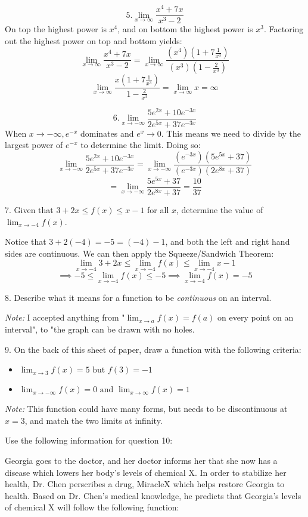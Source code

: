 \documentclass[fleqn]{article}
\begin{document}
\[5.\lim_{x\to\infty}\frac{x^4+7x}{x^3-2}\]
On top the highest power is $x^4$, and on bottom the highest power is $x^3$. Factoring out the highest power on top and bottom yields:
\[\lim_{x\to\infty}\frac{x^4+7x}{x^3-2}=\lim_{x\to\infty}\frac{(x^4)(1+7\frac{1}{x^3})}{(x^3)(1-\frac{2}{x^3})}\]
\[\lim_{x\to\infty}\frac{x(1+7\frac{1}{x^3})}{1-\frac{2}{x^3}}=\lim_{x\to\infty}x=\infty\]


\[6.\lim_{x\to -\infty}\frac{5e^{2x}+10e^{-3x}}{2e^{5x}+37e^{-3x}}\]
When $x\to-\infty, e^{-x}$ dominates and $e^{x}\to0$. This means we need to divide by the largest power of $e^{-x}$ to determine the limit.\linebreak
Doing so:
\[\lim_{x\to -\infty}\frac{5e^{2x}+10e^{-3x}}{2e^{5x}+37e^{-3x}}=\lim_{x\to-\infty}\frac{(e^{-3x})(5e^{5x}+37)}{(e^{-3x})(2e^{8x}+37)}\]
\[=\lim_{x\to-\infty}\frac{5e^{5x}+37}{2e^{8x}+37}=\frac{10}{37}\]

7. Given that $3+2x\leq f(x)\leq x-1$ for all $x$, determine the value of $\lim_{x\to-4}f(x)$. \linebreak

Notice that $3+2(-4)= -5 = (-4)-1$, and both the left and right hand sides are continuous. We can then apply the Squeeze/Sandwich Theorem:
\[\lim_{x\to-4}3+2x\leq\lim_{x\to-4} f(x)\leq\lim_{x\to-4} x-1\]
\[\implies -5\leq\lim_{x\to-4} f(x) \leq -5\implies \lim_{x\to-4}f(x)=-5\]

8. Describe what it means for a function to be \textit{continuous} on an interval. \linebreak

\textit{Note:} I accepted anything from "$\lim_{x\to a}f(x) =f(a)$ on every point on an interval", to "the graph can be drawn with no holes.

9. On the back of this sheet of paper, draw a function with the following criteria:

\begin{itemize}
    \item $\lim_{x\to3}f(x)=5 \text{ but } f(3)=-1$
    \item $\lim_{x\to-\infty}f(x)=0 \text{ and } \lim_{x\to\infty}f(x)=1$
\end{itemize}

\textit{Note:} This function could have many forms, but needs to be discontinuous at $x=3$, and match the two limits at infinity.

Use the following information for question 10:

Georgia goes to the doctor, and her doctor informs her that she now has a disease which lowers her body's levels of chemical X.
In order to stabilize her health, Dr. Chen perscribes a drug, MiracleX which helps restore Georgia to health.
Based on Dr. Chen's medical knowledge, he predicts that Georgia's levels of chemical X will follow the following function:
\end{document}
